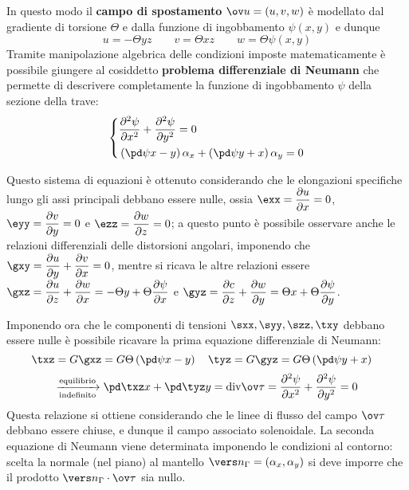     	In questo modo il \textbf{campo di spostamento} $\ov u = (u,v,w)$ è modellato dal gradiente di torsione $\Theta$ e dalla funzione di ingobbamento $\psi(x,y)$ e dunque
    	\[ u = - \Theta yz \qquad v = \Theta xz \qquad w = \Theta \psi(x,y) \]
    	Tramite manipolazione algebrica delle condizioni imposte matematicamente è possibile giungere al cosiddetto \textbf{problema differenziale di Neumann} che permette di descrivere completamente la funzione di ingobbamento $\psi$ della sezione della trave:
    	\begin{equation} \label{eq:tors:neumann}
    		\left\{ \begin{aligned}
    			& \frac{\partial^2 \psi}{\partial x^2} + \frac{\partial^2 \psi}{\partial y^2} = 0 \\
    			& \left(\pd \psi x - y\right) \alpha_x + \left(\pd \psi y + x\right) \alpha_y = 0
    		\end{aligned} \right.
    	\end{equation}
    	\begin{dimostrazione}
    		Questo sistema di equazioni è ottenuto considerando che le elongazioni specifiche lungo gli assi principali debbano essere nulle, ossia $\exx = \dfrac{\partial u}{\partial x} = 0$, $\eyy = \dfrac{\partial v}{\partial y} = 0$ e $\ezz = \dfrac{\partial w}{\partial z} = 0$; a questo punto è possibile osservare anche le relazioni differenziali delle distorsioni angolari, imponendo che $\gxy = \dfrac {\partial u}{\partial y} + \dfrac{\partial v}{\partial x} = 0$, mentre si ricava le altre relazioni essere $\gxz = \dfrac {\partial u}{\partial z} + \dfrac{\partial w}{\partial x} = -\Theta y 	+ \Theta \dfrac{\partial \psi}{\partial x}$ e $\gyz = \dfrac {\partial c}{\partial z} + \dfrac{\partial w}{\partial y} = \Theta x 	+ \Theta \dfrac{\partial \psi}{\partial y}$.
    		
    		Imponendo ora che le componenti di tensioni $\sxx, \syy, \szz,\txy $ debbano essere nulle è possibile ricavare la prima equazione differenziale di Neumann:
    		\[ \txz = G\gxz = G\Theta \left(\pd \psi x - y\right) \quad \tyz = G\gyz = G\Theta \left(\pd \psi y +x\right) \quad \]
    		\[ \xrightarrow[\textrm{indefinito}]{\textrm{equilibrio}}  \pd \txz x + \pd \tyz y = \textrm{div}\ov \tau = \frac{\partial ^2 \psi}{\partial x ^2}  + \frac{\partial ^2 \psi}{\partial y ^2} = 0  	 \]
    		Questa relazione si ottiene considerando che le linee di flusso del campo $\ov \tau$ debbano essere chiuse, e dunque il campo associato solenoidale. La seconda equazione di Neumann viene determinata imponendo le condizioni al contorno: scelta la normale (nel piano) al mantello $\vers n_\Gamma = (\alpha_x,\alpha_y)$ 	si deve imporre che il prodotto $\vers n_\Gamma \cdot \ov \tau$ sia nullo.   		
    	\end{dimostrazione}
    	
